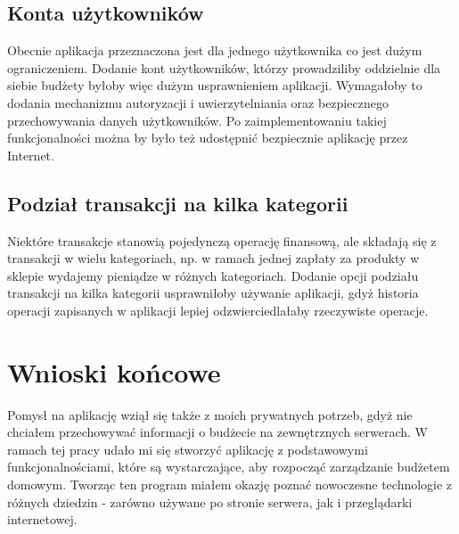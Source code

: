 \documentclass[shortabstract,inz]{iithesis}
\begin{document}
\subsection{Konta użytkowników}
Obecnie aplikacja przeznaczona jest dla jednego użytkownika co jest dużym ograniczeniem. Dodanie kont użytkowników, którzy prowadziliby oddzielnie dla siebie budżety byłoby więc dużym usprawnieniem aplikacji. Wymagałoby to dodania mechanizmu autoryzacji i uwierzytelniania oraz bezpiecznego przechowywania danych użytkowników. Po zaimplementowaniu takiej funkcjonalności można by było też udostępnić bezpiecznie aplikację przez Internet.
\subsection{Podział transakcji na kilka kategorii}
Niektóre transakcje stanowią pojedynczą operację finansową, ale składają się z transakcji w wielu kategoriach, np. w ramach jednej zapłaty za produkty w sklepie wydajemy pieniądze w różnych kategoriach. Dodanie opcji podziału transakcji na kilka kategorii usprawniłoby używanie aplikacji, gdyż historia operacji zapisanych w aplikacji lepiej odzwierciedlałaby rzeczywiste operacje.
\section{Wnioski końcowe}
Pomysł na aplikację wziął się także z moich prywatnych potrzeb, gdyż nie chciałem przechowywać informacji o budżecie na zewnętrznych serwerach. W ramach tej pracy udało mi się stworzyć aplikację z podstawowymi funkcjonalnościami, które są wystarczające, aby rozpocząć zarządzanie budżetem domowym. Tworząc ten program miałem okazję poznać nowoczesne technologie z różnych dziedzin - zarówno używane po stronie serwera, jak i przeglądarki internetowej.



\end{document}
